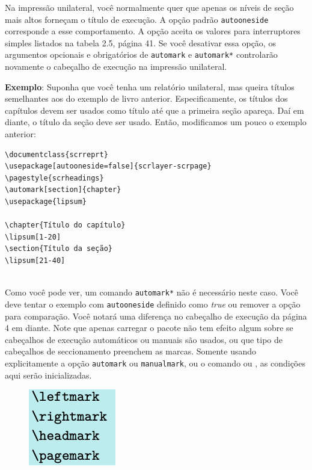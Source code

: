 Na impressão unilateral, você normalmente quer que apenas os níveis de seção mais altos forneçam o título de execução. A opção padrão \texttt{autooneside} corresponde a esse comportamento. A opção aceita os valores para interruptores simples listados na tabela 2.5, página 41. Se você desativar essa opção, os argumentos opcionais e obrigatórios de \texttt{automark} e \texttt{automark*} controlarão novamente o cabeçalho de execução na impressão unilateral.

\textbf{Exemplo}: Suponha que você tenha um relatório unilateral, mas queira títulos semelhantes aos do exemplo de livro anterior. Especificamente, os títulos dos capítulos devem ser usados como título até que a primeira seção apareça. Daí em diante, o título da seção deve ser usado. Então, modificamos um pouco o exemplo anterior:
\begin{verbatim}
\documentclass{scrreprt}
\usepackage[autooneside=false]{scrlayer-scrpage}
\pagestyle{scrheadings}
\automark[section]{chapter}
\usepackage{lipsum}

\chapter{Título do capítulo}
\lipsum[1-20]
\section{Título da seção}
\lipsum[21-40]
    
\end{verbatim}

Como você pode ver, um comando \texttt{automark*} não é necessário neste caso. Você deve tentar o exemplo com \texttt{autooneside} definido como \textit{true} ou remover a opção para comparação. Você notará uma diferença no cabeçalho de execução da página 4 em diante.
Note que apenas carregar o pacote não tem efeito algum sobre se cabeçalhos de execução automáticos ou manuais são usados, ou que tipo de cabeçalhos de seccionamento preenchem as marcas. Somente usando explicitamente a opção \texttt{automark} ou \texttt{manualmark}, ou o comando  ou , as condições aqui serão inicializadas.

\begin{figure}[h]
     \includegraphics[width=0.2\linewidth]{imagem08.png}
\end{figure}

